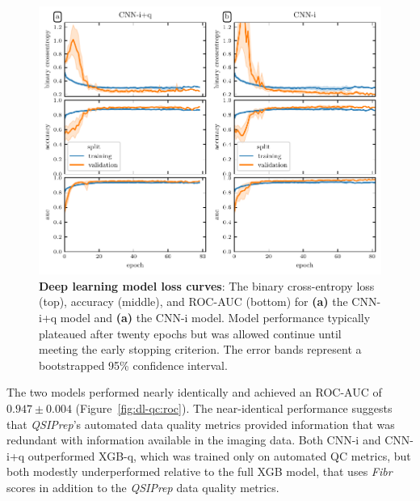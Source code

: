 \documentclass[fleqn,10pt,inline]{wlscirep}
\begin{document}
\begin{figure}[tbp]
    \centering
    \includegraphics[width=\linewidth]{deep-learning-qc/dl_learning_curves.pdf}
    \caption[Deep learning model loss curves]{%
        {\bf Deep learning model loss curves}:
        The binary cross-entropy loss (top), accuracy (middle), and ROC-AUC
        (bottom) for \textbf{(a)} the CNN-i+q model and \textbf{(a)} the CNN-i
        model. Model performance typically plateaued after twenty epochs but was
        allowed continue until meeting the early stopping criterion. The error
        bands represent a bootstrapped 95\% confidence interval.
    }
    \label{fig:dl-loss}
\end{figure}

The two models performed nearly identically and achieved an ROC-AUC of $0.947 \pm 0.004$ (Figure~\ref{fig:dl-qc:roc}). The
near-identical performance suggests that \emph{QSIPrep}'s automated data quality metrics
provided information that was redundant with information available in the imaging
data. Both CNN-i and CNN-i+q outperformed XGB-q, which was trained only on
automated QC metrics, but both modestly underperformed relative to the full XGB model,
that uses \emph{Fibr} scores in addition to the \emph{QSIPrep} data quality metrics.
\end{document}
